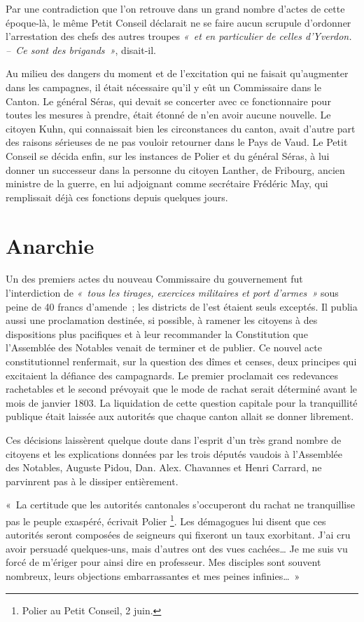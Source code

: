 \documentclass[french,twoside]{book} %
\newenvironment{quoteblock}%
  {\begin{quoting}}
  {\end{quoting}}
\newenvironment{quotebar}{%
    \def\FrameCommand{{\color{rubric!10!}\vrule width 0.5em} \hspace{0.9em}}%
    \def\OuterFrameSep{\itemsep} %
    \MakeFramed {\advance\hsize-\width \FrameRestore}
  }%
  {%
    \endMakeFramed
  }
\renewenvironment{quoteblock}%
  {%
    \savenotes
    \setstretch{0.9}
    \normalfont
    \begin{quotebar}
  }
  {%
    \end{quotebar}
    \spewnotes
  }
\begin{document}
\noindent Par une contradiction que l’on retrouve dans un grand nombre d’actes de cette époque-là, le même Petit Conseil déclarait ne se faire aucun scrupule d’ordonner l’arrestation des chefs des autres troupes \emph{« et en particulier de celles d’Yverdon. – Ce sont des brigands »}, disait-il.\par
Au milieu des dangers du moment et de l’excitation qui ne faisait qu’augmenter dans les campagnes, il était nécessaire qu’il y eût un Commissaire dans le Canton. Le général Séras, qui devait se concerter avec ce fonctionnaire pour toutes les mesures à prendre, était étonné de n’en avoir aucune nouvelle. Le citoyen Kuhn, qui connaissait bien les circonstances du canton, avait d’autre part des raisons sérieuses de ne pas vouloir retourner dans le Pays de Vaud. Le Petit Conseil se décida enfin, sur les instances de Polier et du général Séras, à lui donner un successeur dans la personne du citoyen Lanther, de Fribourg, ancien ministre de la guerre, en lui adjoignant comme secrétaire Frédéric May, qui remplissait déjà ces fonctions depuis quelques jours.
\section[{Anarchie}]{Anarchie}
\noindent Un des premiers actes du nouveau Commissaire du gouvernement fut l’interdiction de \emph{« tous les tirages, exercices militaires et port d’armes »} sous peine de 40 francs d’amende ; les districts de l’est étaient seuls exceptés. Il publia aussi une proclamation destinée, si possible, à ramener les citoyens à des dispositions plus pacifiques et à leur recommander la Constitution que l’Assemblée des Notables venait de terminer et de publier. Ce nouvel acte constitutionnel renfermait, sur la question des dîmes et censes, deux principes qui excitaient la défiance des campagnards. Le premier proclamait ces redevances rachetables et le second prévoyait que le mode de rachat serait déterminé avant le mois de janvier 1803. La liquidation de cette question capitale pour la tranquillité publique était laissée aux autorités que chaque canton allait se donner librement.\par
Ces décisions laissèrent quelque doute dans l’esprit d’un très grand nombre de citoyens et les explications données par les trois députés vaudois à l’Assemblée des Notables, Auguste Pidou, Dan. Alex. Chavannes et Henri Carrard, ne parvinrent pas à le dissiper entièrement.\par

\begin{quoteblock}
 \noindent  « La certitude que les autorités cantonales s’occuperont du rachat ne tranquillise pas le peuple exaspéré, écrivait Polier \footnote{Polier au Petit Conseil, 2 juin.}. Les démagogues lui disent que ces autorités seront composées de seigneurs qui fixeront un taux exorbitant. J’ai cru avoir persuadé quelques-uns, mais d’autres ont des vues cachées… Je me suis vu forcé de m’ériger pour ainsi dire en professeur. Mes disciples sont souvent nombreux, leurs objections embarrassantes et mes peines infinies… »
 \end{quoteblock}
\end{document}
